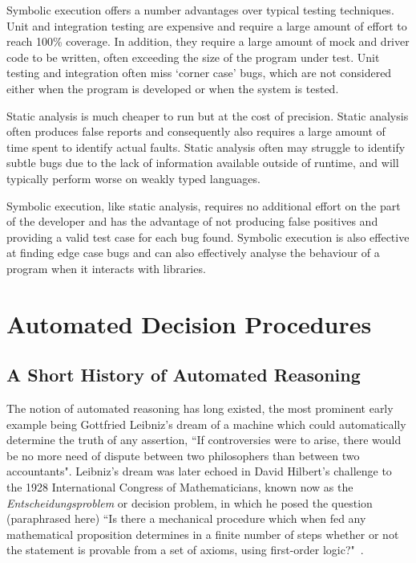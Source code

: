 \documentclass[]{final_report}
\begin{document}
Symbolic execution offers a number advantages over typical testing techniques. Unit and integration testing are expensive and require a large amount of effort to reach 100\% coverage. In addition, they require a large amount of mock and driver code to be written, often exceeding the size of the program under test. Unit testing and integration often miss `corner case' bugs, which are not considered either when the program is developed or when the system is tested.

Static analysis is much cheaper to run but at the cost of precision. Static analysis often produces false reports and consequently also requires a large amount of time spent to identify actual faults. Static analysis often may struggle to identify subtle bugs due to the lack of information available outside of runtime, and will typically perform worse on weakly typed languages.

Symbolic execution, like static analysis, requires no additional effort on the part of the developer and has the advantage of not producing false positives and providing a valid test case for each bug found. Symbolic execution is also effective at finding edge case bugs and can also effectively analyse the behaviour of a program when it interacts with libraries.

\chapter{Automated Decision Procedures}

\section{A Short History of Automated Reasoning}
The notion of automated reasoning has long existed, the most prominent early example being Gottfried Leibniz's dream of a machine which could automatically determine the truth of any assertion, ``If controversies were to arise, there would be no more need of dispute between two philosophers than between two accountants". Leibniz's dream was later echoed in David Hilbert's challenge to the 1928 International Congress of Mathematicians, known now as the \textit{Entscheidungsproblem} or decision problem, in which he posed the question (paraphrased here) ``Is there a mechanical procedure which when fed any mathematical proposition determines in a finite number of steps whether or not the statement is provable from a set of axioms, using first-order logic?"~\cite{smtwheredowegofromhere, automatedreasoningbooklet2004}.
\end{document}
